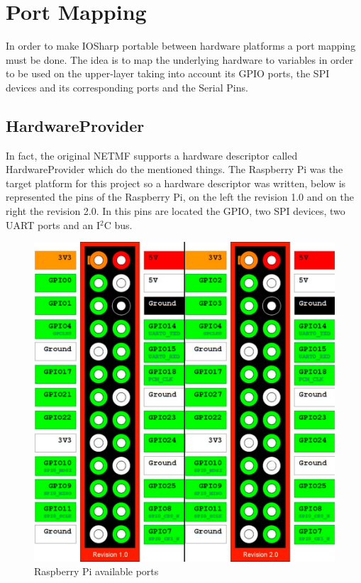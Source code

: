 \section{Port Mapping}\label{S:Port-Mapping}
In order to make IOSharp portable between hardware platforms a port mapping must be done. The idea is to map the underlying hardware to variables in order to be used on the upper-layer taking into account its GPIO ports, the SPI devices and its corresponding ports and the Serial Pins.

\subsection{HardwareProvider}\label{SS:HardwareProvider}
In fact, the original NETMF supports a hardware descriptor called HardwareProvider which do the mentioned things. The Raspberry Pi was the target platform for this project so a hardware descriptor was written, below is represented the pins of the Raspberry Pi, on the left the revision 1.0 and on the right the revision 2.0. In this pins are located the GPIO, two SPI devices, two UART ports and an I$^{2}$C bus.

\begin{figure}[H]\begin{center}
 \centering
  \captionsetup{justification=centering}
  \includegraphics[scale=0.30]{pictures/iosharp/mapping-raspberrypi}
  \caption{Raspberry Pi available ports\label{fig:mapping-rpi}}
\end{center}\end{figure}

